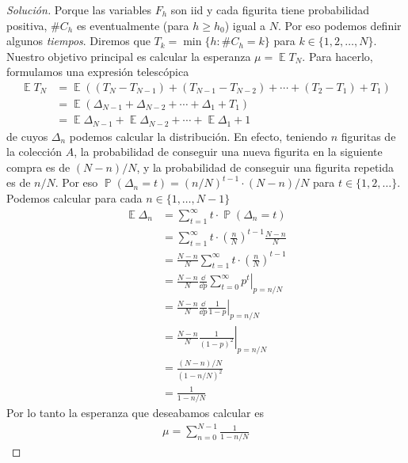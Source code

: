 \documentclass{article}
\DeclareMathOperator{\prob}{\mathbb{P}}
\DeclareMathOperator{\Exp}{\mathbb{E}}
\theoremstyle{definition}
\begin{document}
\begin{proof}[Solución]
Porque las variables $F_h$ son iid y cada figurita tiene probabilidad positiva, $\#C_h$ es eventualmente (para $h \geq h_0$) igual a $N$.
Por eso podemos definir algunos \emph{tiempos}.
Diremos que $T_k = \min \{h : \#C_h = k\}$ para $k \in \{1, 2, \dots, N\}$.
Nuestro objetivo principal es calcular la esperanza $\mu = \Exp{T_N}$.
Para hacerlo, formulamos una expresión telescópica 
\begin{align}
    \Exp T_N 
    &= 
    \Exp \left( (T_N - T_{N - 1}) + (T_{N - 1} - T_{N - 2}) + \cdots + (T_2 - T_1) + T_1 \right)
    \\
    &= 
    \Exp \left( \Delta_{N - 1} + \Delta_{N - 2} + \cdots + \Delta_1 + T_1 \right)
    \\
    &= 
    \Exp \Delta_{N - 1} + \Exp \Delta_{N - 2} + \cdots + \Exp \Delta_1 + 1 
\end{align}
de cuyos $\Delta_n$ podemos calcular la distribución.
En efecto, teniendo $n$ figuritas de la colección $A$, la probabilidad de conseguir una nueva figurita en la siguiente compra es de $(N - n) / N$, y la probabilidad de conseguir una figurita repetida es de $n / N$.
Por eso $\prob(\Delta_n = t) = (n / N)^{t - 1} \cdot (N - n) / N$ para $t \in \{1, 2, \dots\}$.
Podemos calcular para cada $n \in \{1, \dots, N - 1\}$
\begin{align}
    \Exp \Delta_n
    &=
    \sum_{t = 1}^{\infty} t  \cdot \prob(\Delta_n = t)
    \\
    &=
    \sum_{t = 1}^{\infty} t \cdot \left(\frac{n}{N}\right)^{t - 1} \frac{N - n}{N}
    \\
    &=
    \frac{N - n}{N} \sum_{t = 1}^{\infty} t \cdot \left(\frac{n}{N}\right)^{t - 1}
    \\
    &=
    \frac{N - n}{N} \left. \frac{\dd}{\dd p} \sum_{t = 0}^{\infty} p^t \right|_{p = n / N}
    \\
    &=
    \frac{N - n}{N} \left. \frac{\dd}{\dd p} \frac{1}{1 - p} \right|_{p = n / N}
    \\
    &=
    \frac{N - n}{N} \left. \frac{1}{(1 - p)^2} \right|_{p = n / N}
    \\
    &=
    \frac{(N - n) / N}{(1 - n / N)^2}
    \\
    &=
    \frac{1}{1 - n / N}
\end{align}
Por lo tanto la esperanza que deseabamos calcular es
\begin{align}
    \mu = \sum_{n = 0}^{N - 1} \frac{1}{1 - n / N}
\end{align}


\end{proof}
\end{document}
